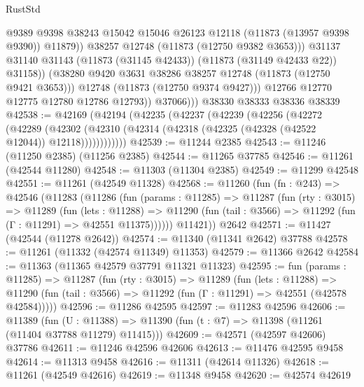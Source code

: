 \begin{lexlean}{RustStd}
\begin{coremodule}
                          @9389
                          @9398
                          @38243
                          @15042
                          @15046
                          @26123
                          @12118
                          (@11873 (@13957 @9398 @9390))
                          @11879))
                      @38257
                      @12748
                      (@11873 (@12750 @9382 @3653)))
                    @31137
                    @31140
                    @31143
                    (@11873 (@31145 @42433))
                    (@11873 (@31149 @42433 @22))
                    @31158))
                (@38280 @9420 @3631 @38286 @38257 @12748 (@11873 (@12750 @9421 @3653)))
                @12748
                (@11873 (@12750 @9374 @9427)))
              @12766
              @12770
              @12775
              @12780
              @12786
              @12793))
          @37066)))
    @38330
    @38333
    @38336
    @38339
@42538 := @42169
    (@42194
      (@42235
        (@42237
          (@42239
            (@42256
              (@42272
                (@42289
                  (@42302
                    (@42310 (@42314 (@42318 (@42325 (@42328 (@42522 @12044)) @12118))))))))))))
@42539 := @11244 @2385
@42543 := @11246 (@11250 @2385) (@11256 @2385)
@42544 := @11265 @37785
@42546 := @11261 (@42544 @11280)
@42548 := @11303 (@11304 @2385)
@42549 := @11299 @42548
@42551 := @11261 (@42549 @11328)
@42568 := @11260
    (fun (fn : @243) =>
    @42546
      (@11283
        (@11286
          (fun (params : @11285) =>
          @11287
            (fun (rty : @3015) =>
            @11289
              (fun (lets : @11288) =>
              @11290 (fun (tail : @3566) => @11292 (fun (Γ : @11291) => @42551 @11375))))))
        @11421))
    @2642
@42571 := @11427 (@42544 (@11278 @2642))
@42574 := @11340 (@11341 @2642) @37788
@42578 := @11261 (@11332 (@42574 @11349) @11353)
@42579 := @11366 @2642
@42584 := @11363 (@11365 @42579 @37791 @11321 @11323)
@42595 := fun (params : @11285) =>
  @11287
    (fun (rty : @3015) =>
    @11289
      (fun (lets : @11288) =>
      @11290 (fun (tail : @3566) => @11292 (fun (Γ : @11291) => @42551 (@42578 @42584)))))
@42596 := @11286 @42595
@42597 := @11283 @42596
@42606 := @11389
    (fun (U : @11388) => @11390 (fun (t : @7) => @11398 (@11261 (@11404 @37788 @11279) @11415)))
@42609 := @42571 (@42597 @42606) @37786
@42611 := @11246 @42596 @42606
@42613 := @11476 @42595 @9458
@42614 := @11313 @9458
@42616 := @11311 (@42614 @11326)
@42618 := @11261 (@42549 @42616)
@42619 := @11348 @9458
@42620 := @42574 @42619

\end{coremodule}
\end{lexlean}

